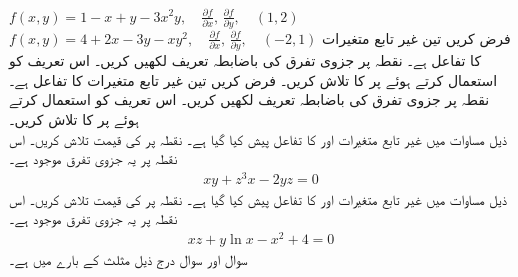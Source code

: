$f(x,y)=1-x+y-3x^2y,\quad \frac{\partial f}{\partial x},\,\frac{\partial f}{\partial y},\quad (1,2)$
$f(x,y)=4+2x-3y-xy^2,\quad \frac{\partial f}{\partial x},\,\frac{\partial f}{\partial y},\quad (-2,1)$
فرض کریں  تین غیر تابع متغیرات کا تفاعل ہے۔ نقطہ  پر جزوی تفرق   کی باضابطہ تعریف  لکھیں کریں۔ اس تعریف کو استعمال کرتے ہوئے  پر  کا  تلاش کریں۔
فرض کریں  تین غیر تابع متغیرات کا تفاعل ہے۔ نقطہ  پر جزوی تفرق   کی باضابطہ تعریف  لکھیں کریں۔ اس تعریف کو استعمال کرتے ہوئے  پر  کا  تلاش کریں۔
\\
 ذیل مساوات  میں     غیر تابع متغیرات  اور  کا تفاعل  پیش کیا گیا ہے۔ نقطہ  پر  کی قیمت تلاش کریں۔ اس نقطہ پر   یہ  جزوی تفرق  موجود ہے۔  
\begin{align*}
xy+z^3x-2yz=0
\end{align*}
 ذیل مساوات  میں     غیر تابع متغیرات  اور  کا تفاعل  پیش کیا گیا ہے۔ نقطہ  پر  کی قیمت تلاش کریں۔ اس نقطہ پر   یہ  جزوی تفرق  موجود ہے۔  
\begin{align*}
xz+y\ln x-x^2+4=0
\end{align*}
سوال  اور سوال  درج ذیل مثلث  کے بارے میں ہے۔
\begin{center}
\end{center}

